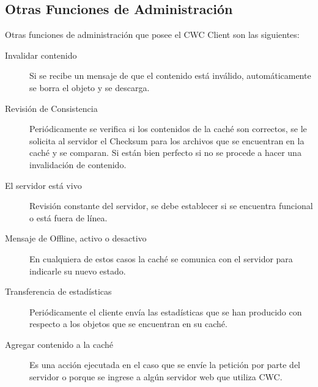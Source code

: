 \subsection{Otras Funciones de Administración}
Otras funciones de administración que posee el CWC Client son las siguientes:
\begin{description}
\item[Invalidar contenido] Si se recibe un mensaje de que el contenido está inválido, automáticamente se borra el objeto y se descarga.

\item [Revisión de Consistencia] Periódicamente se verifica si los contenidos de la caché son correctos, se le solicita al servidor el Checksum para los archivos que se encuentran en la caché y se comparan. Si están bien perfecto si no se procede a hacer una invalidación de contenido.

\item [El servidor está vivo] Revisión constante del servidor, se debe establecer si se encuentra funcional o está fuera de línea.

\item [Mensaje de Offline, activo o desactivo] En cualquiera de estos casos la caché se comunica con el servidor para indicarle su nuevo estado.

\item [Transferencia de estadísticas] Periódicamente el cliente envía las estadísticas que se han producido con respecto a los objetos que se encuentran en su caché. 

\item [Agregar contenido a la caché] Es una acción ejecutada en el caso que se envíe la petición por parte del servidor o porque se ingrese a algún servidor web que utiliza CWC.
\end{description}
